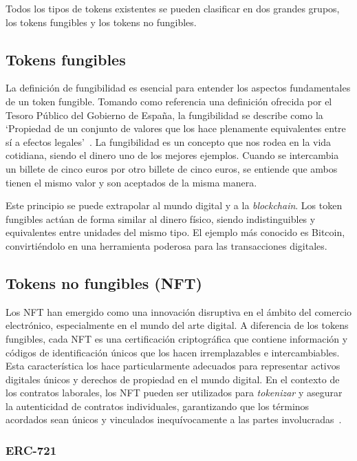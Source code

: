 Todos los tipos de tokens existentes se pueden clasificar en dos grandes grupos, los tokens fungibles y los tokens no fungibles.


\subsection{Tokens fungibles}

La definición de fungibilidad es esencial para entender los aspectos fundamentales de un token fungible. Tomando como referencia una definición ofrecida por el Tesoro Público del Gobierno de España, la fungibilidad se describe como la `Propiedad de un conjunto de valores que los hace plenamente equivalentes entre sí a efectos legales'~\cite{fungibilidadGob}.
La fungibilidad es un concepto que nos rodea en la vida cotidiana, siendo el dinero uno de los mejores ejemplos. Cuando se intercambia un billete de cinco euros por otro billete de cinco euros, se entiende que ambos tienen el mismo valor y son aceptados de la misma manera.

Este principio se puede extrapolar al mundo digital y a la \textit{blockchain}. Los token fungibles actúan de forma similar al dinero físico, siendo indistinguibles y equivalentes entre unidades del mismo tipo.
El ejemplo más conocido es Bitcoin, convirtiéndolo en una herramienta poderosa para las transacciones digitales.


\subsection{Tokens no fungibles (NFT)}

Los NFT han emergido como una innovación disruptiva en el ámbito del comercio electrónico, especialmente en el mundo del arte digital.
A diferencia de los tokens fungibles, cada NFT es una certificación criptográfica que contiene información y códigos de identificación únicos que los hacen irremplazables e intercambiables.
Esta característica los hace particularmente adecuados para representar activos digitales únicos y derechos de propiedad en el mundo digital.
En el contexto de los contratos laborales, los NFT pueden ser utilizados para \textit{tokenizar} y asegurar la autenticidad de contratos individuales, garantizando que los términos acordados sean únicos y vinculados inequívocamente a las partes involucradas~\cite{NFTintroducción}.


\subsubsection{ERC-721}


